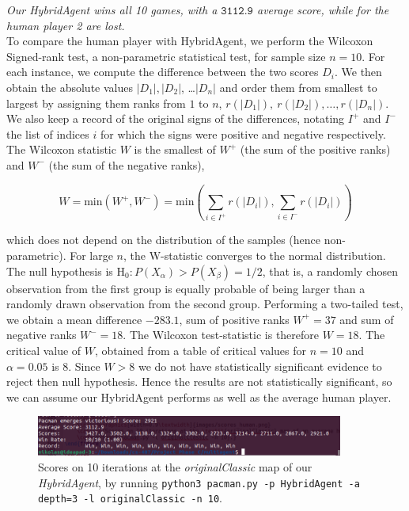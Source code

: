 \documentclass{article}
\def\code#1{\texttt{#1}}
\begin{document}
\textit{Our HybridAgent wins all 10 games, with a $\code{3112.9}$ average score, while for the human player 2 are lost.} \\

To compare the human player with HybridAgent, we perform the Wilcoxon Signed-rank test, a non-parametric statistical test, for sample size $n=10$. For each instance, we compute the difference between the two scores $D_i$. We then obtain the absolute values $|D_1|, |D_2|$, \ldots $|D_n|$ and order them from smallest to largest by assigning them ranks from $1$ to $n$, $r(|D_1|), ~r(|D_2|), \ldots, r(|D_n|)$. We also keep a record of the original signs of the differences, notating $I^+$ and $I^-$ the list of indices $i$ for which the signs were positive and negative respectively. The Wilcoxon statistic $W$ is the smallest of $W^+$ (the sum of the positive ranks) and $W^-$ (the sum of the negative ranks),


$$W = \text{min}(W^+, W^-) = \text{min} (\sum_{i \in I^+} r(|D_i|), \sum_{i \in I^-} r(|D_i|) )$$

which does not depend on the distribution of the samples (hence non-parametric). For large $n$, the W-statistic converges to the normal distribution. The null hypothesis is $\text{H}_0 : P(X_\alpha) > P(X_\beta) = 1/2$, that is, a randomly chosen observation from the first group is equally probable of being larger than a randomly drawn observation from the second group. Performing a two-tailed test, we obtain a mean difference $-283.1$, sum of positive ranks $W^+ =37$ and sum of negative ranks $W^- = 18$. The Wilcoxon test-statistic is therefore $W = 18$. The critical value of $W$, obtained from a table of critical values for $n = 10$ and $\alpha=0.05$ is $8$. Since $W > 8$ we do not have statistically significant evidence to reject then null hypothesis. Hence the results are not statistically significant, so we can assume our HybridAgent performs as well as the average human player.

\begin{figure}[h]
	\centering
	\includegraphics[width=0.9\textwidth]{images/scores.png}
    \caption{Scores on 10 iterations at the \textit{originalClassic} map of our \textit{HybridAgent}, by running \code{python3 pacman.py -p HybridAgent -a depth=3 -l originalClassic -n 10}.}
    	 
\end{figure}
\end{document}
